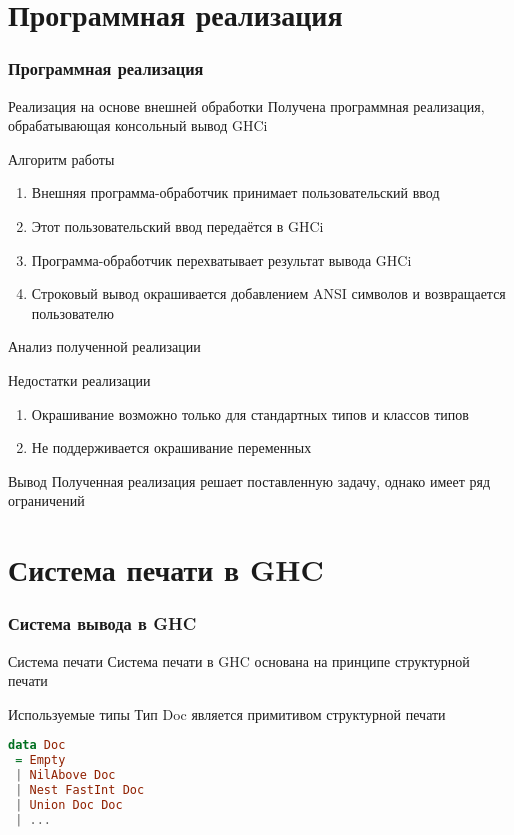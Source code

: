 \documentclass[utf8,russian]{beamer}
\begin{document}
\section{Программная реализация}
\begin{frame}
\frametitle{Программная реализация}

\begin{block}{Реализация на основе внешней обработки}
Получена программная реализация, обрабатывающая консольный вывод GHCi
\end{block}

\begin{block}{Алгоритм работы}
\begin{enumerate}
  \item Внешняя программа-обработчик принимает пользовательский ввод
  \item Этот пользовательский ввод передаётся в GHCi
  \item Программа-обработчик перехватывает результат вывода GHCi
  \item Строковый вывод окрашивается добавлением ANSI символов и возвращается пользователю
\end{enumerate}
\end{block}
\end{frame}
\begin{frame}{Анализ полученной реализации}

\begin{block}{Недостатки реализации}

  \begin{enumerate}
    \item Окрашивание возможно только для стандартных типов и классов типов
    \item Не поддерживается окрашивание переменных
  \end{enumerate}
\end{block}


\begin{block}{Вывод}
Полученная реализация решает поставленную задачу, однако имеет ряд ограничений
\end{block}

\end{frame}

\section{Система печати в GHC}

\begin{frame}[fragile]
\frametitle{Система вывода в GHC}
\begin{block}{Система печати}
Система печати в GHC основана на принципе структурной печати
\end{block}

\begin{block}{Используемые типы}
Тип Doc является примитивом структурной печати
\begin{lstlisting}[language=Haskell]
data Doc
 = Empty
 | NilAbove Doc
 | Nest FastInt Doc
 | Union Doc Doc
 | ...
\end{lstlisting}
\end{block}
\end{frame}
\end{document}
